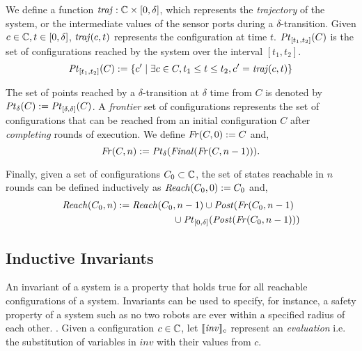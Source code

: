 We define a function $\mathit{traj}: \mathbb{C} \times \left[0,\delta\right]$, which represents the \emph{trajectory} of the system, or the intermediate values of the sensor ports during a $\delta$-transition. Given $c\in \mathbb{C}, t\in \left[0,\delta\right]$, $\mathit{traj}(c,t)$ represents the configuration at time $t$. $\mathit{Pt}_{[t_1,t_2]}(C)$ is the set of configurations reached by the system over the interval $[t_1,t_2]$.
$$\mathit{Pt}_{[t_1,t_2]}(C) := \left\{c^\prime \mid \exists c\in C, t_1 \leq t\leq t_2 , c^\prime = \mathit{traj}(c,t)\right\}$$

The set of points reached by a $\delta$-transition at $\delta$ time from $C$ is denoted by  $\mathit{Pt}_{\delta}(C) := \mathit{Pt}_{[\delta,\delta]}(C)$. A \emph{frontier} set of configurations represents the set of configurations that can be reached from an initial configuration $C$ after \emph{completing} rounds of execution. 
We define $\mathit{Fr}(C,0) := C$ and,
$$\mathit{Fr}(C,n) := \mathit{Pt}_{\delta}(\mathit{Final}(\mathit{Fr}(C,n-1))).$$


Finally, given a set of configurations $C_0\subset\mathbb{C}$, the set of states reachable in $n$ rounds can be defined inductively as $\mathit{Reach}(C_0,0) := C_0$ and,
\begin{align*}
\mathit{Reach}(C_0,n) := \mathit{Reach}(C_0 &,n-1) \cup \mathit{Post}(\mathit{Fr}(C_0,n-1) \\ &\cup \mathit{Pt}_{[0,\delta]}(\mathit{Post}(\mathit{Fr}(C_0,n-1)))
\end{align*}



\subsection{Inductive Invariants}
An invariant of a system is a property that holds true for all reachable configurations of a system. Invariants can be used to specify, for instance, a safety property of a system such as no two robots are ever within a specified radius of each other. .
Given a configuration $c \in \mathbb{C}$, let $\llbracket\mathit{inv}\rrbracket_{c}$ represent an \emph{evaluation} i.e. the substitution of variables in $\mathit{inv}$ with their values from $c$.

